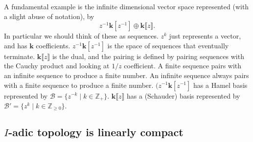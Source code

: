         \begin{ex}
        A fundamental example is the infinite dimensional vector space represented (with a slight abuse of notation), by
        \[ z^{-1} \mathbf{k}[z^{-1}] \oplus \mathbf{k}\lBrack z \rBrack.\]
        In particular we should think of these as sequences. \(z^k\) just represents a vector, and has \( \mathbf{k}\) coefficients. \( z^{-1} \mathbf{k}[z^{-1}] \) is the space of sequences that eventually terminate. \( \mathbf{k}\lBrack z \rBrack\) is the dual, and the pairing is defined by pairing sequences with the Cauchy product and looking at \(1/z\) coefficient. A finite sequence pairs with an infinite sequence to produce a finite number. An infinite sequence always pairs with a finite sequence to produce a finite number. 
        \((z^{-1} \mathbf{k}[z^{-1}]\) has a Hamel basis represented by \(\mathcal{B}= \{ z^{-k}\; |\; k \in \mathbb{Z}_{+}\}\). \( \mathbf{k} \lBrack z \rBrack \) has a (Schauder) basis represented by \( \mathcal{B}' = \{ z^{k}\; | \; k \in \mathbb{Z}_{\geq 0}\}\).
        \end{ex} 
        

        
        

        
        
        
        

        \iffalse 
        
        \subsection{\texorpdfstring{\(I\)}{I}-adic topology is linearly compact}
        
